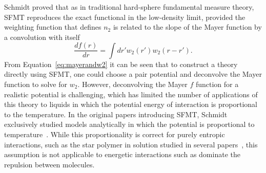 \documentclass[letterpaper,twocolumn,amsmath,amssymb,prb]{revtex4-1}
\begin{document}
Schmidt proved that as in traditional hard-sphere fundamental measure theory, SFMT reproduces the exact functional in
the low-density limit, provided the weighting function that defines
$n_2$ is related to the slope of the Mayer function by a convolution
with itself
\begin{equation}\label{eq:mayerandw2}
  \frac{d f(r)}{dr} = \int dr' w_2(r') w_2 (r-r').
\end{equation}
From Equation~\ref{eq:mayerandw2} it can be seen that to construct a theory directly using SFMT, one could choose a pair potential and deconvolve the Mayer
function to solve for $w_2$. 
However, deconvolving the Mayer $f$ function for a realistic potential is challenging, which has limited the number of applications of this
theory to liquids in which the potential energy of interaction is
proportional to the temperature. 
In the original papers introducing SFMT, Schmidt
exclusively studied models analytically in which the potential is
proportional to temperature~\cite{schmidt1999density,
  schmidt2000fluid}.  While this proportionality is correct for purely
entropic interactions, such as the star polymer in solution studied in
several papers~\cite{schmidt1999density}, this assumption is not
applicable to energetic interactions such as dominate the repulsion
between molecules.
\end{document}
